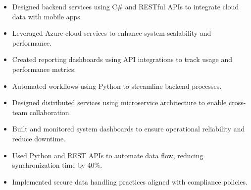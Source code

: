\par\smallskip
\noindent
\begin{minipage}{20cm}
  \begin{minipage}{9.75cm}
    \begin{itemize}
      \item Designed backend services using C# and RESTful APIs to integrate cloud data with mobile apps.
      \item Leveraged Azure cloud services to enhance system scalability and performance.
    \end{itemize}
  \end{minipage}
  \hfill
  \begin{minipage}{9.75cm}
    \begin{itemize}
      \item Created reporting dashboards using API integrations to track usage and performance metrics.
      \item Automated workflows using Python to streamline backend processes.
    \end{itemize}
  \end{minipage}
\end{minipage}
\par\smallskip
\divider

\par\smallskip
\noindent
\begin{minipage}{20cm}
  \begin{minipage}{9.75cm}
    \begin{itemize}
      \item Designed distributed services using microservice architecture to enable cross-team collaboration.
      \item Built and monitored system dashboards to ensure operational reliability and reduce downtime.
    \end{itemize}
  \end{minipage}
  \hfill
  \begin{minipage}{9.75cm}
    \begin{itemize}
      \item Used Python and REST APIs to automate data flow, reducing synchronization time by 40\%.
      \item Implemented secure data handling practices aligned with compliance policies.
    \end{itemize}
  \end{minipage}
\end{minipage}

